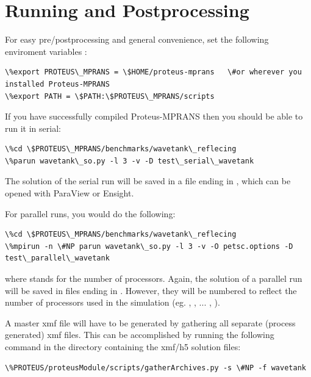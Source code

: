 \documentclass[letterpaper,12pt,english]{sphinxmanual}
\begin{document}
\chapter{Running and Postprocessing}
\label{index:running-and-postprocessing}\label{index:running-sec}
For easy pre/postprocessing and general convenience, set the following enviroment variables :

\begin{Verbatim}[commandchars=\\\{\}]
\%export PROTEUS\_MPRANS = \$HOME/proteus-mprans   \#or wherever you installed Proteus-MPRANS
\%export PATH = \$PATH:\$PROTEUS\_MPRANS/scripts
\end{Verbatim}

If you have successfully compiled Proteus-MPRANS then you should be able to run it in serial:

\begin{Verbatim}[commandchars=\\\{\}]
\%cd \$PROTEUS\_MPRANS/benchmarks/wavetank\_reflecing
\%parun wavetank\_so.py -l 3 -v -D test\_serial\_wavetank
\end{Verbatim}

The solution of the serial run will be saved in a file ending in , which can be
opened with ParaView or Ensight.

For parallel runs, you would do the following:

\begin{Verbatim}[commandchars=\\\{\}]
\%cd \$PROTEUS\_MPRANS/benchmarks/wavetank\_reflecing
\%mpirun -n \#NP parun wavetank\_so.py -l 3 -v -O petsc.options -D test\_parallel\_wavetank
\end{Verbatim}

where  stands for the number of processors. Again, the solution of a parallel run will be saved
in files ending in . However, they  will be numbered to reflect the number of processors 
used in the simulation (eg. , , ... , ).

A master xmf file will have to be generated by gathering all separate (process generated) xmf
files. This can be accomplished by running the following command in the directory containing
the xmf/h5 solution files:

\begin{Verbatim}[commandchars=\\\{\}]
\%PROTEUS/proteusModule/scripts/gatherArchives.py -s \#NP -f wavetank
\end{Verbatim}
\end{document}
